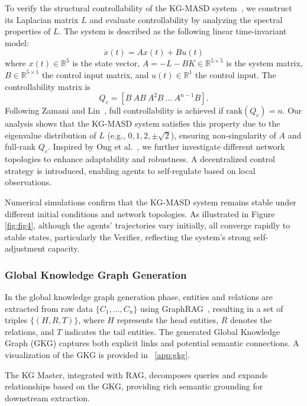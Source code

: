\documentclass[preprint,12pt]{elsarticle}
\begin{document}
To verify the structural controllability of the KG-MASD system~\cite{Lin1974}, we construct its Laplacian matrix $L$ and evaluate controllability by analyzing the spectral properties of $L$. The system is described as the following linear time-invariant model:
\begin{equation}
\dot{x}(t) = A x(t) + B u(t)
\end{equation}
where $x(t) \in \mathbb{R}^5$ is the state vector, $A = -L - BK \in \mathbb{R}^{5 \times 5}$ is the system matrix, $B \in \mathbb{R}^{5 \times 1}$ the control input matrix, and $u(t) \in \mathbb{R}^1$ the control input. The controllability matrix is
\begin{equation}
Q_c = [B \ AB \ A^2 B \ \ldots \ A^{n-1} B].
\end{equation}
Following Zamani and Lin~\cite{Zamani2009}, full controllability is achieved if $\text{rank}(Q_c)=n$. Our analysis shows that the KG-MASD system satisfies this property due to the eigenvalue distribution of $L$ (e.g., $0,1,2,\pm\sqrt{2}$), ensuring non-singularity of $A$ and full-rank $Q_c$. Inspired by Ong et al.~\cite{Guan2021}, we further investigate different network topologies to enhance adaptability and robustness. A decentralized control strategy is introduced, enabling agents to self-regulate based on local observations.  


Numerical simulations confirm that the KG-MASD system remains stable under different initial conditions and network topologies. As illustrated in Figure \ref{fig:fig4}, although the agents’ trajectories vary initially, all converge rapidly to stable states, particularly the Verifier, reflecting the system’s strong self-adjustment capacity.  



\subsubsection{Global Knowledge Graph Generation}  


In the global knowledge graph generation phase, entities and relations are extracted from raw data $\{C_1, \ldots, C_n\}$ using GraphRAG~\cite{Han2025}, resulting in a set of triples $\{(H, R, T)\}$, where $H$ represents the head entities, $R$ denotes the relations, and $T$ indicates the tail entities. The generated Global Knowledge Graph (GKG) captures both explicit links and potential semantic connections. A visualization of the GKG is provided in ~\ref{app:gkg}.

The KG Master, integrated with RAG, decomposes queries and expands relationships based on the GKG, providing rich semantic grounding for downstream extraction.
\end{document}

